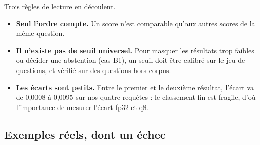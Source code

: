 Trois règles de lecture en découlent.
\begin{itemize}
\item \textbf{Seul l'ordre compte.} Un score n'est comparable qu'aux autres scores de la même question.
\item \textbf{Il n'existe pas de seuil universel.} Pour masquer les résultats trop faibles ou décider une abstention
  (cas B1), un seuil doit être calibré sur le jeu de questions, et vérifié sur des questions hors corpus.
\item \textbf{Les écarts sont petits.} Entre le premier et le deuxième résultat, l'écart va de 0,0008 à 0,0095 sur
  nos quatre requêtes \mesure : le classement fin est fragile, d'où l'importance de mesurer l'écart fp32 et q8.
\end{itemize}

\subsection{Exemples réels, dont un échec}\label{sec:exemples}

